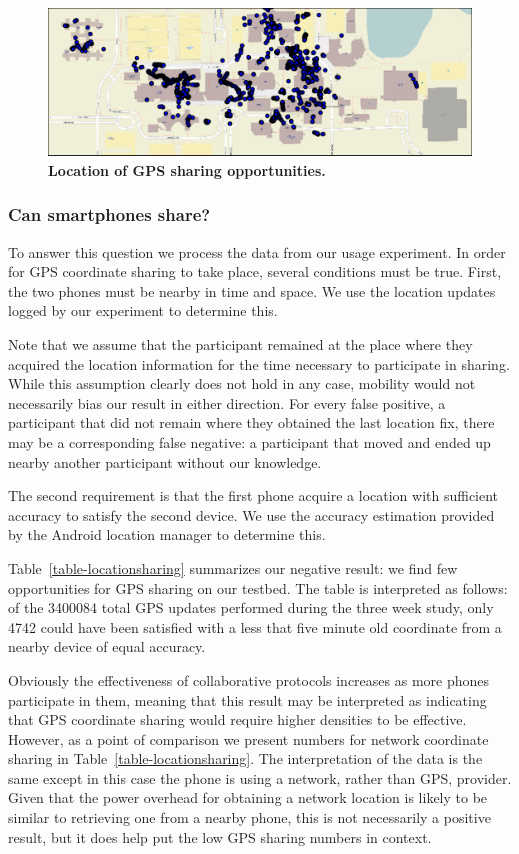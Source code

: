 \begin{figure}[t]
\includegraphics[width=\textwidth]{./figures/location/loc_sharing/map_gps_all.pdf}
\caption{\textbf{Location of GPS sharing opportunities.}}
\label{fig-locationsharing}
\end{figure}

\subsubsection{Can smartphones share?}

To answer this question we process the data from our usage experiment. In
order for GPS coordinate sharing to take place, several conditions must be
true. First, the two phones must be nearby in time and space. We use the
location updates logged by our experiment to determine this.

Note that we assume that the participant remained at the place where they
acquired the location information for the time necessary to participate in
sharing. While this assumption clearly does not hold in any case, mobility
would not necessarily bias our result in either direction. For every false
positive, a participant that did not remain where they obtained the last
location fix, there may be a corresponding false negative: a participant that
moved and ended up nearby another participant without our knowledge.

The second requirement is that the first phone acquire a location with
sufficient accuracy to satisfy the second device. We use the accuracy
estimation provided by the Android location manager to determine this.

Table~\ref{table-locationsharing} summarizes our negative result: we find few
opportunities for GPS sharing on our testbed. The table is interpreted as
follows: of the \num{3400084} total GPS updates performed during the three
week study, only \num{4742} could have been satisfied with a less that five
minute old coordinate from a nearby device of equal accuracy.

Obviously the effectiveness of collaborative protocols increases as more
phones participate in them, meaning that this result may be interpreted as
indicating that GPS coordinate sharing would require higher densities to be
effective. However, as a point of comparison we present numbers for network
coordinate sharing in Table~\ref{table-locationsharing}. The interpretation
of the data is the same except in this case the phone is using a network,
rather than GPS, provider. Given that the power overhead for obtaining a
network location is likely to be similar to retrieving one from a nearby
phone, this is not necessarily a positive result, but it does help put the low
GPS sharing numbers in context.

